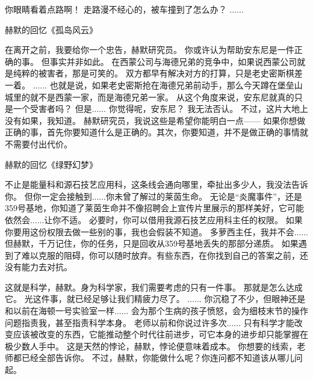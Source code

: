 \documentclass[openany]{book}
\begin{document}
\begin{dialogue}
     你眼睛看着点路啊！
     走路漫不经心的，被车撞到了怎么办？
     ......
\end{dialogue}

{
\begin{center}赫默的回忆《孤岛风云》\end{center}
\begin{dialogue}
     在离开之前，我要给你一个忠告，赫默研究员。
     你或许认为帮助安东尼是一件正确的事。
     但事实并非如此。
     在西蒙公司与海德兄弟的竞争中，如果说西蒙公司就是纯粹的被害者，那是可笑的。
     双方都早有解决对方的打算，只是老史密斯棋差一着。
     ......
     也就是说，如果老史密斯抢在海德兄弟前动手，那么今天蹲在堡垒山城里的就不是西蒙一家，而是海德兄弟一家。
     从这个角度来说，安东尼就真的只是一个受害者吗？
     但是......
     你觉得呢，安东尼？
     我无法否认。
     不过，这片大地上没有如果，我知道。
     赫默研究员，我说这些是希望你能明白一点——
     如果你想做正确的事，首先你要知道什么是正确的。其次，你要知道，并不是做正确的事情就不需要付出代价。
\end{dialogue}}

{
\begin{center}赫默的回忆《绿野幻梦》\end{center}
\begin{dialogue}
     不止是能量科和源石技艺应用科，这条线会通向哪里，牵扯出多少人，我没法告诉你。
     但你一定会接触到......你未曾了解过的莱茵生命。
     无论是“炎魔事件”，还是359号基地，你知道了莱茵生命并不像招聘会上宣传片里展示的那样美好，它可能依然会......让你不适。
     必要时，你可以借用我源石技艺应用科主任的权限。
     如果你要用这份权限去做一些别的事，我也会假装不知道。
     多萝西主任，我并不会......
     但赫默，千万记住，你的任务，只是回收从359号基地丢失的那部分递质。
     如果遇到了难以克服的阻碍，你可以随时放弃。有些东西，在你找到自己的答案之前，还没有能力去对抗。
\end{dialogue}}

\begin{dialogue}
     这就是科学，赫默。身为科学家，我们需要考虑的只有一件事。
     那就是怎么达成它。
     光这件事，就已经足够让我们精疲力尽了。
     ......
     你沉稳了不少，但眼神还是和以前在海顿一号实验室一样......
     会为那个生病的孩子愤怒，会为细枝末节的操作问题指责我，甚至指责科学本身。
     老师以前和你说过许多次......
     只有科学才能改变应该被改变的东西，它能推动整个时代往前进步，可它本身的进步却只能掌握在极少数人手中。
     这是天然的悖论，赫默，悖论便意味着成本。
     你想要的线索，老师都已经全部告诉你。
     不过，赫默，你能做什么呢？你连问都不知道该从哪儿问起。
\end{dialogue}
\end{document}
